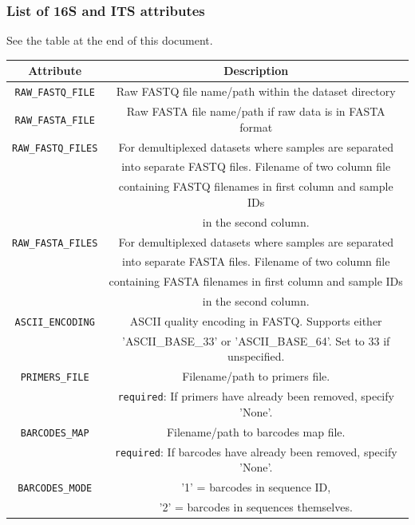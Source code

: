 \documentclass[11pt, oneside]{article}   	%
\begin{document}
\subsubsection{List of 16S and ITS attributes}
See the table at the end of this document.
\begin{table}[h!]
  \begin{center}
    \label{tab:table1}
    \begin{tabular}{| c | c |}
    \hline
      \textbf{Attribute} & \textbf{Description} \\
      \hline
      {\tt RAW\_FASTQ\_FILE} & Raw FASTQ file name/path within the dataset directory \\
      \hline
      {\tt RAW\_FASTA\_FILE} & Raw FASTA file name/path if raw data is in FASTA format \\
      \hline
      {\tt RAW\_FASTQ\_FILES}
       & For demultiplexed datasets where samples are separated \\
       & into separate FASTQ files.  Filename of two column file \\
       & containing FASTQ filenames in first column and sample IDs \\
       & in the second column. \\
       \hline
      {\tt RAW\_FASTA\_FILES} 
       & For demultiplexed datasets where samples are separated \\
       & into separate FASTA files.  Filename of two column file \\
       & containing FASTA filenames in first column and sample IDs \\
       & in the second column. \\
       \hline
      {\tt ASCII\_ENCODING} & ASCII quality encoding in FASTQ.  Supports either \\
       & 'ASCII\_BASE\_33'  or 'ASCII\_BASE\_64'.  Set to 33 if unspecified. \\
       \hline
      {\tt PRIMERS\_FILE} & Filename/path to primers file. \\
       & {\tt required}: If primers have already been removed, specify 'None'. \\
       \hline
      {\tt BARCODES\_MAP} & Filename/path to barcodes map file. \\
       & {\tt required}: If barcodes have already been removed, specify 'None'. \\
       \hline
      {\tt BARCODES\_MODE} & '1' = barcodes in sequence ID, \\
       &  '2' = barcodes in sequences themselves. \\

\end{tabular}
\end{center}
\end{table}
\end{document}
